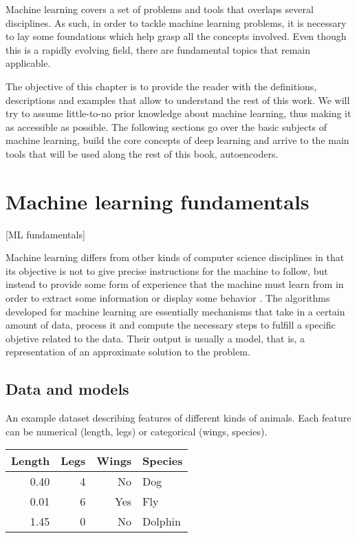 
Machine learning covers a set of problems and tools that overlaps several disciplines. As such, in order to tackle machine learning problems, it is necessary to lay some foundations which help grasp all the concepts involved. Even though this is a rapidly evolving field, there are fundamental topics that remain applicable.

The objective of this chapter is to provide the reader with the definitions, descriptions and examples that allow to understand the rest of this work. We will try to assume little-to-no prior knowledge about machine learning, thus making it as accessible as possible. The following sections go over the basic subjects of machine learning, build the core concepts of deep learning and arrive to the main tools that will be used along the rest of this book, autoencoders.

\section{Machine learning fundamentals}[ML fundamentals]

Machine learning differs from other kinds of computer science disciplines in that its objective is not to give precise instructions for the machine to follow, but instead to provide some form of experience that the machine must learn from in order to extract some information or display some behavior . The algorithms developed for machine learning are essentially mechanisms that take in a certain amount of data, process it and compute the necessary steps to fulfill a specific objetive related to the data. Their output is usually a model, that is, a representation of an approximate solution to the problem. 
 
\subsection{Data and models}

\begin{margintable}
\caption{\label{tbl:dataset}An example dataset describing features of different kinds of animals. Each feature can be numerical (length, legs) or categorical (wings, species).}\footnotesize
\begin{tabular}{rrrl}\toprule
Length & Legs & Wings & Species\\\midrule
0.40 & 4 & No & Dog\\
0.01 & 6 & Yes & Fly\\
1.45 & 0 & No & Dolphin\\\bottomrule
\end{tabular}
\end{margintable}

